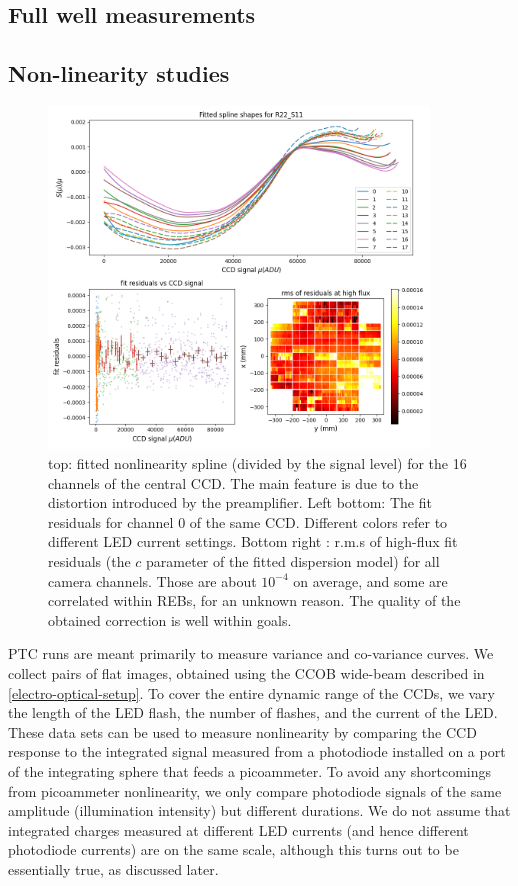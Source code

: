 \subsection{Full well measurements}\label{fullwell}

\subsection{Non-linearity studies}\label{nonlinearity}
\begin{figure}[ht]
\begin{centering}
\includegraphics[width=0.9\textwidth]{figures/nonlin_plots.png}
\end{centering}
\caption{top: fitted nonlinearity spline (divided by the signal level) for the 16 channels of the central CCD. The main feature is due to the distortion introduced by the preamplifier. Left bottom: The fit residuals for channel 0 of the same CCD. Different colors refer to different LED current settings. Bottom right : r.m.s of high-flux fit residuals (the $c$ parameter of the fitted dispersion model) for all camera channels. Those are about $10^{-4}$ on average, and some are correlated within REBs, for an unknown reason. The quality of the obtained correction is well within goals.\label{fig:nonlin_model}}

\end{figure}

PTC runs are meant primarily to measure variance and co-variance curves. We collect pairs of flat images, obtained using the CCOB wide-beam described in \ref{electro-optical-setup}. To cover the entire dynamic range of the CCDs, we vary the length of the LED flash, the number of flashes, and the current of the LED. These data sets can be used to measure nonlinearity by comparing the CCD response to the integrated signal measured from a photodiode installed on a port of the integrating sphere that feeds a picoammeter. To avoid any shortcomings from picoammeter nonlinearity, we only compare photodiode signals of the same amplitude (illumination intensity) but different durations. We do not assume that integrated charges measured at different LED currents (and hence different photodiode currents) are on the same scale, although this turns out to be essentially true, as discussed later. 


